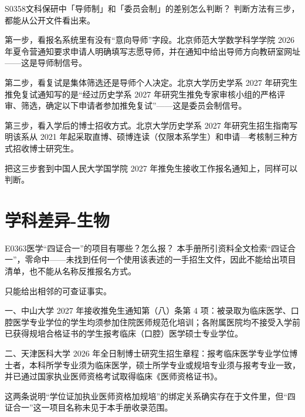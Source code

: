 \begin{qa}{S0358}{文科保研中「导师制」和「委员会制」的差别怎么判断？}
判断方法有三步，都能从公开文件看出来。

第一步，看报名系统里有没有“意向导师”字段。北京师范大学数学科学学院 2026 年夏令营通知要求申请人明确填写志愿导师，并在通知中给出导师方向教研室网址——这是导师制信号。

第二步，看复试是集体筛选还是导师个人决定。北京大学历史学系 2027 年研究生推免复试通知写的是“经过历史学系 2027 年研究生推免专家审核小组的严格评审、筛选，确定以下申请者参加推免复试”——这是委员会制信号。

第三步，看入学后的博士招收方式。北京大学历史学系 2027 年研究生招生指南写明该系从 2021 年起采取直博、硕博连读（仅限本系学生）和申请—考核制三种方式招收博士研究生。

把这三步套到中国人民大学国学院 2027 年推免生接收工作报名通知上，同样可以判断。
\end{qa}

\section{学科差异-生物}
\begin{qa}{E0363}{医学“四证合一”的项目有哪些？怎么报？}
本手册所引资料全文检索“四证合一”，零命中——未找到任何一个使用该表述的一手招生文件，因此不能给出项目清单，也不能从名称反推报名方式。

只能给出相邻的可查证事实。

一、中山大学 2027 年接收推免生通知第（八）条第 4 项：被录取为临床医学、口腔医学专业学位的学生均须参加住院医师规范化培训；各附属医院均不接受入学前已获得规培合格证书的学生报考临床（口腔）医学硕士专业学位。

二、天津医科大学 2026 年全日制博士研究生招生章程：报考临床医学专业学位博士者，本科所学专业须为临床医学，硕士所学专业或规培专业须与报考专业一致，并已通过国家执业医师资格考试取得临床《医师资格证书》。

这两条说明“学位证加执业医师资格加规培”的绑定关系确实存在于文件里，但“四证合一”这一项目名称未见于本手册收录范围。
\end{qa}

